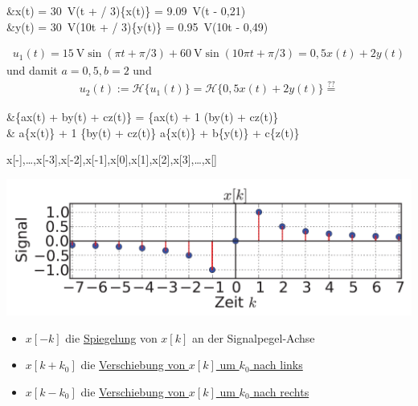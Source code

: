 \documentclass[parskip=half]{scrreprt}
\begin{document}
	\begin{abox}
		&\quad x(t) = \SI{30}{\volt}\sin(\pi t + \pi / 3)\quad {}\quad {}\{x(t)\} = \SI{9,09}{\volt}\sin(\pi t - 0,21)\\
		&\quad y(t) = \SI{30}{\volt}\sin(10\pi t + \pi / 3)\quad {}\quad {}\{y(t)\} = \SI{0,95}{\volt}\sin(10\pi t - 0,49)
	\end{abox}
		
	\begin{tbox}
		\begin{align*}
		u_1(t) = \SI{15}{\volt}\sin(\pi t + \pi/3) + \SI{60}{\volt}\sin(10\pi t + \pi/3) = 0,5x(t) + 2y(t)
		\end{align*}
		und damit $a = 0,5, b=2$ und
		\begin{align*}
		u_2(t):= \mathcal{H}\{u_1(t)\} = \mathcal{H}\{0,5x(t) + 2y(t)\} \overset{??}{=}
		\end{align*}
	\end{tbox}

	\begin{abox}
		&\{ax(t) + by(t) + cz(t)\} = \{ax(t) + 1 \cdot (by(t) + cz(t)\}\\
		& a\{x(t)\} + 1 \cdot {}\{by(t) + cz(t)\}  a\{x(t)\} + b\{y(t)\} + c\{z(t)\}
	\end{abox}

	\begin{abox}
		x[-\infty],\dots,x[-3],x[-2],x[-1],x[0],x[1],x[2],x[3],\dots,x[\infty]
	\end{abox}

	\begin{tbox}
		\includegraphics[width=\textwidth]{Box9}
	\end{tbox}

	\begin{tbox}
		\begin{itemize}
			\item $x[-k]$ die \underline{Spiegelung} von $x[k]$ an der Signalpegel-Achse
			\item  $x[k + k_0]$ die \underline{Verschiebung von $x[k]$ um $k_0$ nach links}
			\item  $x[k - k_0]$ die \underline{Verschiebung von $x[k]$ um $k_0$ nach rechts}
		\end{itemize}
	\end{tbox}
	
\end{document}
